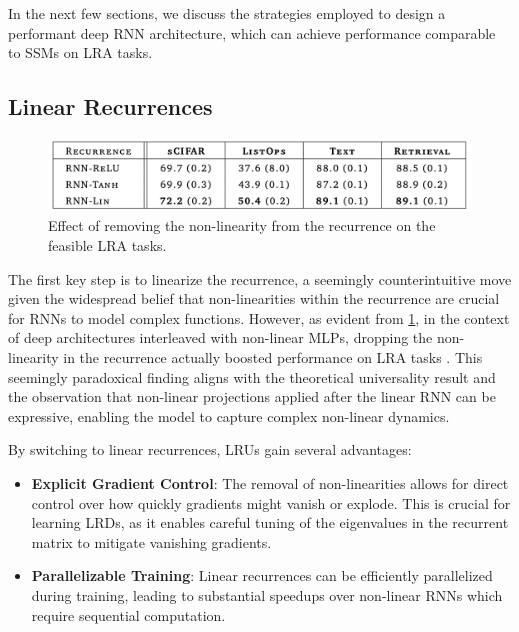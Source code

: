 \documentclass[12pt,a4paper]{report}
\begin{document}
\medskip

In the next few sections, we discuss the strategies employed to design a performant deep RNN architecture, which can achieve performance comparable to SSMs on LRA tasks.

\subsection{Linear Recurrences}

\begin{figure}[ht]
    \centerline{\includegraphics[scale=0.6]{C5.2.1_LRNN_Perf.png}}
    \caption{Effect of removing the non-linearity from the recurrence on the feasible LRA tasks.}
    \label{lrnn-perf}
\end{figure}

The first key step is to linearize the recurrence, a seemingly counterintuitive move given the widespread belief that non-linearities within the recurrence are crucial for RNNs to model complex functions. However, as evident from \ref{lrnn-perf}, in the context of deep architectures interleaved with non-linear MLPs, dropping the non-linearity in the recurrence actually boosted performance on LRA tasks \cite{lra}. This seemingly paradoxical finding aligns with the theoretical universality result \cite{universality_lrnn} and the observation that non-linear projections applied after the linear RNN can be expressive, enabling the model to capture complex non-linear dynamics.

\medskip

By switching to linear recurrences, LRUs gain several advantages:
\begin{itemize}
    \item \textbf{Explicit Gradient Control}: The removal of non-linearities allows for direct control over how quickly gradients might vanish or explode. This is crucial for learning LRDs, as it enables careful tuning of the eigenvalues in the recurrent matrix to mitigate vanishing gradients.
    \item \textbf{Parallelizable Training}: Linear recurrences can be efficiently parallelized during training, leading to substantial speedups over non-linear RNNs which require sequential computation.
\end{itemize}
\end{document}
